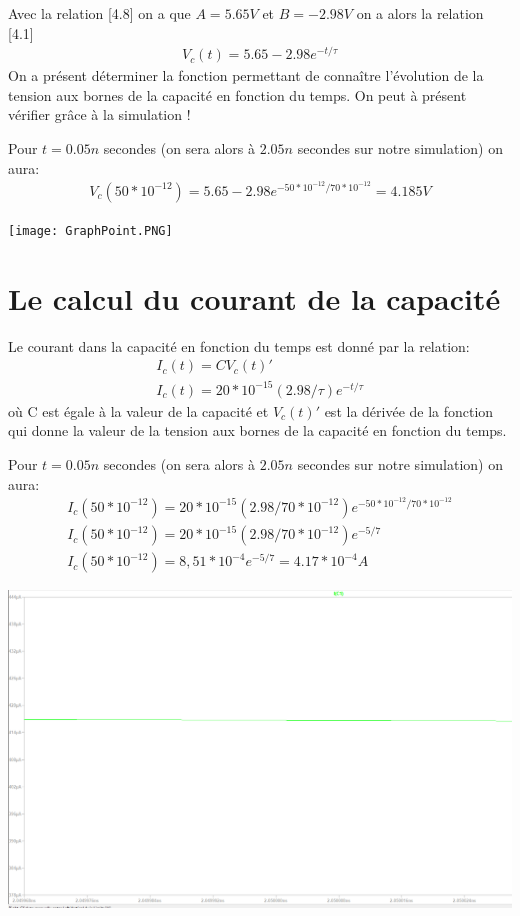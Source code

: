 \documentclass{homeworg}
\begin{document}
Avec la relation [4.8] on a que $A = 5.65V$ et $B = -2.98V$ on a alors la relation [4.1]
\begin{align}
    V_c(t) = 5.65 - 2.98 e^{-t / \tau}
\end{align}
On a présent déterminer la fonction permettant de connaître l'évolution de la tension aux bornes de la capacité en fonction du temps. On peut à présent vérifier grâce à la simulation !

\newpage
Pour $t = 0.05n$ secondes (on sera alors à $2.05n$ secondes sur notre simulation) on aura:
\begin{align}
    V_c(50*10^{-12}) = 5.65 - 2.98 e^{-50*10^{-12} / 70 * 10^{-12}} = 4.185V
\end{align}
\begin{center}
    \texttt{[image: GraphPoint.PNG]}
\end{center}

\newpage
\section{Le calcul du courant de la capacité}
    Le courant dans la capacité en fonction du temps est donné par la relation:
    \begin{align}
        I_c(t) = C V_c(t)'\\
        I_c(t) = 20 * 10^{-15} (2.98/\tau)e^{-t/\tau}
    \end{align}
    où C est égale à la valeur de la capacité et $V_c(t)'$ est la dérivée de la fonction qui donne la valeur de la tension aux bornes de la capacité en fonction du temps.
    
    Pour $t = 0.05n$ secondes (on sera alors à $2.05n$ secondes sur notre simulation) on aura:
    \begin{align}
        I_c(50*10^{-12}) = 20 * 10^{-15} (2.98/70 * 10^{-12})e^{-50*10^{-12}/70 * 10^{-12}}\\
        I_c(50*10^{-12}) = 20 * 10^{-15} (2.98/70 * 10^{-12})e^{-5/7}\\
        I_c(50*10^{-12}) = 8,51 * 10^{-4}e^{-5/7} = 4.17 * 10^{-4}A
    \end{align}
    \begin{center}
        \includegraphics[scale=0.4]{CurrentPoint.PNG}
    \end{center}
\end{document}
